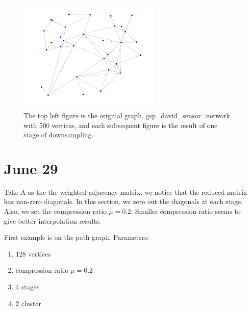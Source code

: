 \documentclass[a4paper]{article}
\begin{document}
\begin{figure}[H]
\includegraphics[width = 7cm]{multiresolution/multires5}

\caption{The top left figure is the original graph, gsp\_david\_sensor\_network with 500 vertices, and each subsequent figure is the result of one stage of downsampling.}
\end{figure}


\section{June 29}
Take A as the the weighted adjacency matrix, we notice that the reduced matrix has non-zero diagonals. In this section, we zero out the diagonals at each stage. Also, we set the compression ratio $\mu = 0.2$. Smaller compression ratio seems to give better interpolation results.

First example is on the path graph. Parameters:
\begin{enumerate}
\item 128 vertices
\item compression ratio $\mu = 0.2$
\item 4 stages
\item 2 cluster
\end{enumerate}
\end{document}
